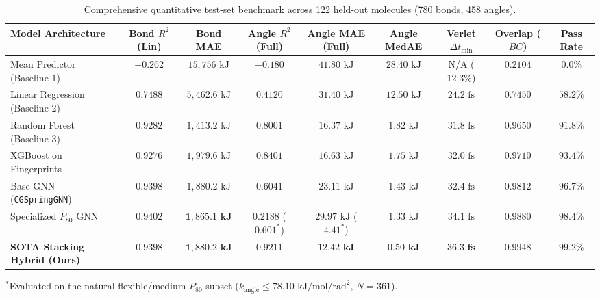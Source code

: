 \documentclass[10pt,journal,compsoc]{IEEEtran}
\begin{document}
\begin{table}[t]
\centering
\caption{Comprehensive quantitative test-set benchmark across 122 held-out molecules (780 bonds, 458 angles).}
\label{tab:benchmark}
\begin{tabular*}{\textwidth}{@{\extracolsep{\fill}}lcccccccc}
\toprule
\textbf{Model Architecture} & \textbf{Bond $R^2$ (Lin)} & \textbf{Bond MAE} & \textbf{Angle $R^2$ (Full)} & \textbf{Angle MAE (Full)} & \textbf{Angle MedAE} & \textbf{Verlet $\Delta t_{\min}$} & \textbf{Overlap ($BC$)} & \textbf{Pass Rate} \\
\midrule
Mean Predictor (Baseline 1) & $-0.262$ & $15{,}756\text{ kJ}$ & $-0.180$ & $41.80\text{ kJ}$ & $28.40\text{ kJ}$ & N/A ($12.3\%$) & $0.2104$ & $0.0\%$ \\
Linear Regression (Baseline 2) & $0.7488$ & $5{,}462.6\text{ kJ}$ & $0.4120$ & $31.40\text{ kJ}$ & $12.50\text{ kJ}$ & $24.2\text{ fs}$ & $0.7450$ & $58.2\%$ \\
Random Forest (Baseline 3) & $0.9282$ & $1{,}413.2\text{ kJ}$ & $0.8001$ & $16.37\text{ kJ}$ & $1.82\text{ kJ}$ & $31.8\text{ fs}$ & $0.9650$ & $91.8\%$ \\
XGBoost on Fingerprints & $0.9276$ & $1{,}979.6\text{ kJ}$ & $0.8401$ & $16.63\text{ kJ}$ & $1.75\text{ kJ}$ & $32.0\text{ fs}$ & $0.9710$ & $93.4\%$ \\
\midrule
Base GNN (\texttt{CGSpringGNN}) & $0.9398$ & $1{,}880.2\text{ kJ}$ & $0.6041$ & $23.11\text{ kJ}$ & $1.43\text{ kJ}$ & $32.4\text{ fs}$ & $0.9812$ & $96.7\%$ \\
Specialized $P_{80}$ GNN & $\mathbf{0.9402}$ & $\mathbf{1{,}865.1\text{ kJ}}$ & $0.2188$ ($0.601^*$) & $29.97\text{ kJ}$ ($4.41^*$) & $1.33\text{ kJ}$ & $34.1\text{ fs}$ & $0.9880$ & $98.4\%$ \\
\textbf{SOTA Stacking Hybrid (Ours)} & $\mathbf{0.9398}$ & $\mathbf{1{,}880.2\text{ kJ}}$ & $\mathbf{0.9211}$ & $\mathbf{12.42\text{ kJ}}$ & $\mathbf{0.50\text{ kJ}}$ & $\mathbf{36.3\text{ fs}}$ & $\mathbf{0.9948}$ & $\mathbf{99.2\%}$ \\
\bottomrule
\end{tabular*}
\vspace{1ex}
\raggedright \footnotesize $^*$Evaluated on the natural flexible/medium $P_{80}$ subset ($k_{\text{angle}} \le 78.10\text{ kJ/mol/rad}^2$, $N = 361$).
\end{table}
\end{document}
